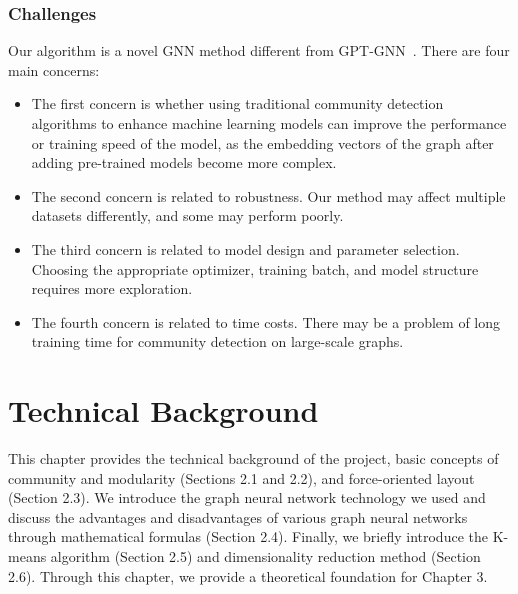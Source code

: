 \documentclass[ %
                    author={Tengyao Tu},
                supervisor={Dr. James Pope},
                    degree={MSc},
                     title={A New Perspective on Graph Community Detection: Combining Traditional Methods with Deep Learning Approaches},
                  subtitle={Applying to Telecom Networks and Diverse Datasets},
                      type={},
                      year={2024}]{dissertation}
\begin{document}
\subsection{Challenges}
Our algorithm is a novel GNN method different from GPT-GNN~\cite{hu2020gpt}. There are four main concerns:
\begin{itemize}
\item The first concern is whether using traditional community detection algorithms to enhance machine learning models can improve the performance or training speed of the model, as the embedding vectors of the graph after adding pre-trained models become more complex.
\item The second concern is related to robustness. Our method may affect multiple datasets differently, and some may perform poorly.
\item The third concern is related to model design and parameter selection. Choosing the appropriate optimizer, training batch, and model structure requires more exploration.
\item The fourth concern is related to time costs. There may be a problem of long training time for community detection on large-scale graphs.

\end{itemize}

\chapter{Technical Background}
This chapter provides the technical background of the project, basic concepts of community and modularity (Sections 2.1 and 2.2), and force-oriented layout (Section 2.3). We introduce the graph neural network technology we used and discuss the advantages and disadvantages of various graph neural networks through mathematical formulas (Section 2.4). Finally, we briefly introduce the K-means algorithm (Section 2.5) and dimensionality reduction method (Section 2.6).  Through this chapter, we provide a theoretical foundation for Chapter 3.
\label{chap:background}
\end{document}
